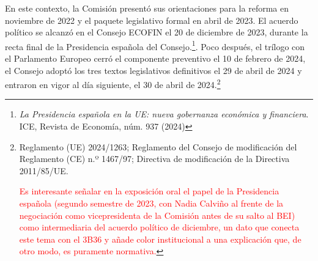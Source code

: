 \documentclass[10pt,a4paper]{article}
\begin{document}
En este contexto, la Comisión presentó sus orientaciones para la reforma en noviembre de 2022 y el paquete legislativo formal en abril de 2023. El acuerdo político se alcanzó en el Consejo ECOFIN el 20 de diciembre de 2023, durante la recta final de la Presidencia española del Consejo.\footnote{%
    \textit{La Presidencia española en la UE: nueva gobernanza económica y financiera}. ICE, Revista de Economía, núm. 937 (2024)
}. Poco después, el trílogo con el Parlamento Europeo cerró el componente preventivo el 10 de febrero de 2024, el Consejo adoptó los tres textos legislativos definitivos el 29 de abril de 2024 y entraron en vigor al día siguiente, el 30 de abril de 2024.\footnote{%
    Reglamento (UE) 2024/1263; Reglamento del Consejo de modificación del Reglamento (CE) n.º 1467/97; Directiva de modificación de la Directiva 2011/85/UE.

\textcolor{red}{Es interesante señalar en la exposición oral el papel de la Presidencia española (segundo semestre de 2023, con Nadia Calviño al frente de la negociación como vicepresidenta de la Comisión antes de su salto al BEI) como intermediaria del acuerdo político de diciembre, un dato que conecta este tema con el 3B36 y añade color institucional a una explicación que, de otro modo, es puramente normativa.}
}
\end{document}

